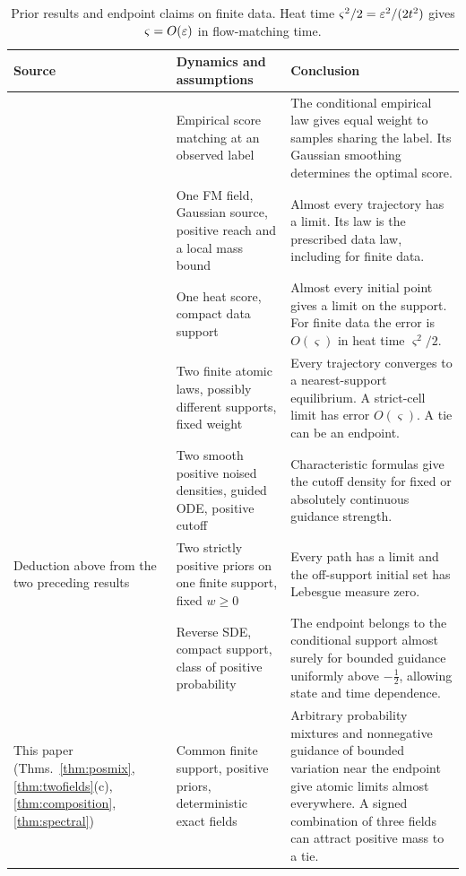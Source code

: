 \documentclass{article} %
\theoremstyle{plain}
\theoremstyle{definition}
\theoremstyle{remark}
\begin{document}
\begin{table}[htb]
\centering\footnotesize\setlength{\tabcolsep}{3pt}
\def\cmpcell{\raggedright\hspace{0pt}}
\begin{tabular}{@{}p{}p{}p{}@{}}
\toprule
Source & Dynamics and assumptions & Conclusion\tabularnewline
\midrule
\cmpcell\citet[Def.~6.2, Thm.~6.4]{baptista2025memorization} &
\cmpcell Empirical score matching at an observed label &
\cmpcell The conditional empirical law gives equal weight to samples sharing the label. Its Gaussian smoothing determines the optimal score.\tabularnewline
\cmpcell\citet[Thm.~5.3]{wan2025elucidating} &
\cmpcell One FM field, Gaussian source, positive reach and a local mass bound &
\cmpcell Almost every trajectory has a limit. Its law is the prescribed data law, including for finite data.\tabularnewline
\cmpcell\citet[Thm.~3.7]{liu2025pde} &
\cmpcell One heat score, compact data support &
\cmpcell Almost every initial point gives a limit on the support. For finite data the error is $O(\varsigma)$ in heat time $\varsigma^2/2$.\tabularnewline
\cmpcell\citet[Thm.~2.5]{liu2026geometric} &
\cmpcell Two finite atomic laws, possibly different supports, fixed weight &
\cmpcell Every trajectory converges to a nearest-support equilibrium. A strict-cell limit has error $O(\varsigma)$. A tie can be an endpoint.\tabularnewline
\cmpcell\citet[Thms.~4.2--4.3]{jiang2026guidance} &
\cmpcell Two smooth positive noised densities, guided ODE, positive cutoff &
\cmpcell Characteristic formulas give the cutoff density for fixed or absolutely continuous guidance strength.\tabularnewline
\cmpcell Deduction above from the two preceding results &
\cmpcell Two strictly positive priors on one finite support, fixed $w\ge0$ &
\cmpcell Every path has a limit and the off-support initial set has Lebesgue measure zero.\tabularnewline
\cmpcell\citet[Thm.~3]{azangulov2026adaptive} &
\cmpcell Reverse SDE, compact support, class of positive probability &
\cmpcell The endpoint belongs to the conditional support almost surely for bounded guidance uniformly above $-\tfrac12$, allowing state and time dependence.\tabularnewline
\cmpcell This paper (Thms.~\ref{thm:posmix}, \ref{thm:twofields}(c), \ref{thm:composition}, \ref{thm:spectral}) &
\cmpcell Common finite support, positive priors, deterministic exact fields &
\cmpcell Arbitrary probability mixtures and nonnegative guidance of bounded variation near the endpoint give atomic limits almost everywhere. A signed combination of three fields can attract positive mass to a tie.\tabularnewline
\bottomrule
\end{tabular}
\caption{Prior results and endpoint claims on finite data. Heat time $\varsigma^2/2=\varepsilon^2/(2t^2)$ gives
$\varsigma=O(\varepsilon)$ in flow-matching time.}
\label{tab:comparison}
\end{table}
\end{document}
